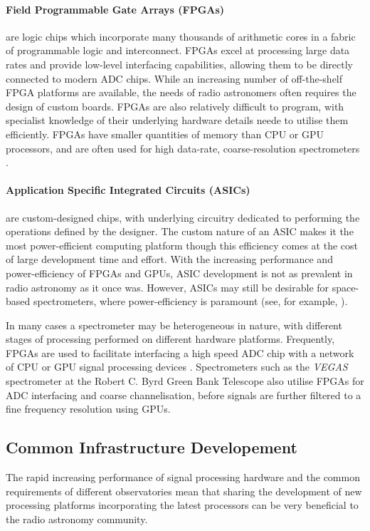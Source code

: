 \documentclass{ws-rv961x669}
\begin{document}
\paragraph{Field Programmable Gate Arrays (FPGAs)} are logic chips which incorporate many thousands of arithmetic cores in a fabric of programmable logic and interconnect.
FPGAs excel at processing large data rates and provide low-level interfacing capabilities, allowing them to be directly connected to modern ADC chips.
While an increasing number of off-the-shelf FPGA platforms are available, the needs of radio astronomers often requires the design of custom boards.
FPGAs are also relatively difficult to program, with specialist knowledge of their underlying hardware details neede to utilise them efficiently. FPGAs have smaller quantities of memory than CPU or GPU processors, and are often used for high data-rate, coarse-resolution spectrometers \citep{Stanko2005, Finger2013}.

\paragraph{Application Specific Integrated Circuits (ASICs)} are custom-designed chips, with underlying circuitry dedicated to performing the operations defined by the designer. The custom nature of an ASIC makes it the most power-efficient computing platform though this efficiency comes at the cost of large development time and effort.
With the increasing performance and power-efficiency of FPGAs and GPUs, ASIC development is not as prevalent in radio astronomy as it once was.
However, ASICs may still be desirable for space-based spectrometers, where power-efficiency is paramount (see, for example, \cite{hochman2014splash}).

In many cases a spectrometer may be heterogeneous in nature, with different stages of processing performed on different hardware platforms.
Frequently, FPGAs are used to facilitate interfacing a high speed ADC chip with a network of CPU or GPU signal processing devices \citep{Siemion2011}. 
Spectrometers such as the \emph{VEGAS} spectrometer at the Robert C. Byrd Green Bank Telescope \citep{Prestage2015} also utilise FPGAs for ADC interfacing and coarse channelisation, before signals are further filtered to a fine frequency resolution using GPUs.


\subsection{Common Infrastructure Developement}
The rapid increasing performance of signal processing hardware and the common requirements of different observatories mean that sharing the development of new processing platforms incorporating the latest processors can be very beneficial to the radio astronomy community.
\end{document}
